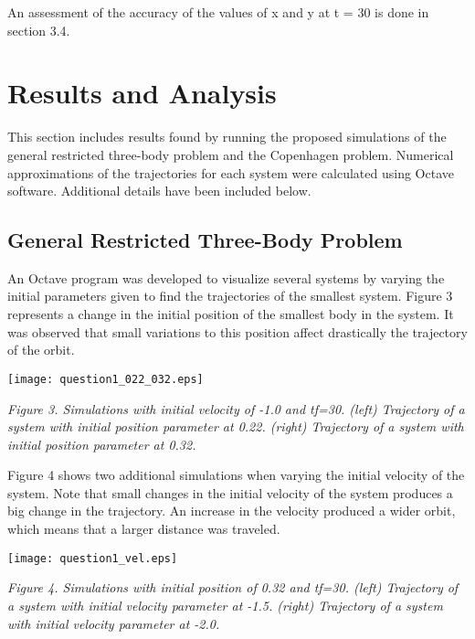 \documentclass{article}
\begin{document}


An assessment of the accuracy of the values of x and y at t = 30 is done in section 3.4.

\section{Results and Analysis}

This section includes results found by running the proposed simulations of the general restricted three-body problem and the Copenhagen problem. Numerical approximations of the trajectories for each system were calculated using Octave software. Additional details have been included below.

\subsection{General Restricted Three-Body Problem}

An Octave program was developed to visualize several systems by varying the initial parameters given to find the trajectories of the smallest system. Figure 3 represents a change in the initial position of the smallest body in the system. It was observed that small variations to this position affect drastically the trajectory of the orbit. 

\begin{center}
  \texttt{[image: question1\_022\_032.eps]}
\end{center}

\begin{center}
   \textit{Figure 3. Simulations with initial velocity of -1.0 and tf=30. (left) Trajectory of a system with initial position parameter at 0.22. (right) Trajectory of a system with initial position parameter at 0.32. }
\end{center}

Figure 4 shows two additional simulations when varying the initial velocity of the system. Note that small changes in the initial velocity of the system produces a big change in the trajectory. An increase in the velocity produced a wider orbit, which means that a larger distance was traveled.

\begin{center}
  \texttt{[image: question1\_vel.eps]}
\end{center}

\begin{center}
   \textit{Figure 4. Simulations with initial position of 0.32 and tf=30. (left) Trajectory of a system with initial velocity parameter at -1.5. (right) Trajectory of a system with initial velocity parameter at -2.0. }
\end{center}
\end{document}

